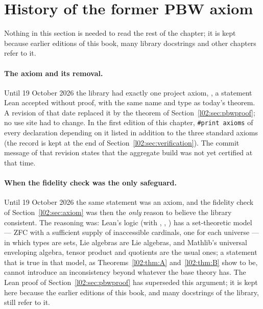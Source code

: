 \section{History of the former PBW axiom}\label{l02:sec:history}

Nothing in this section is needed to read the rest of the chapter; it is kept because earlier editions
of this book, many library docstrings and other chapters refer to it.

\paragraph{The axiom and its removal.} Until 19 October 2026 the library had
exactly one project axiom, , a statement Lean accepted without proof, with
the same name and type as today's theorem. A revision of that date replaced it by the theorem of
Section~\ref{l02:sec:pbwproof}; no use site had to change. In the first edition of this chapter,
\texttt{\#print axioms} of every declaration depending on it listed  in addition to the three
standard axioms (the record is kept at the end of Section~\ref{l02:sec:verification}). The commit message
of that revision states that the aggregate build was not yet certified at that time.

\paragraph{When the fidelity check was the only safeguard.}\label{l02:rem:axiomhistory}
Until 19 October 2026 the same statement was an axiom, and the fidelity check of
Section~\ref{l02:sec:axiom} was then the \emph{only} reason to believe the library consistent. The reasoning was: Lean's logic (with
, , ) has a set-theoretic model --- ZFC with a
sufficient supply of inaccessible cardinals, one for each universe --- in which types are sets, Lie
algebras are Lie algebras, and Mathlib's universal enveloping algebra, tensor product and quotients are
the usual ones; a statement that is true in that model, as Theorems~\ref{l02:thm:A} and~\ref{l02:thm:B}
show  to be, cannot introduce an inconsistency beyond whatever the base theory has.
The Lean proof of Section~\ref{l02:sec:pbwproof} has superseded this argument; it is kept here because
the earlier editions of this book, and many docstrings of the library, still refer to it.

